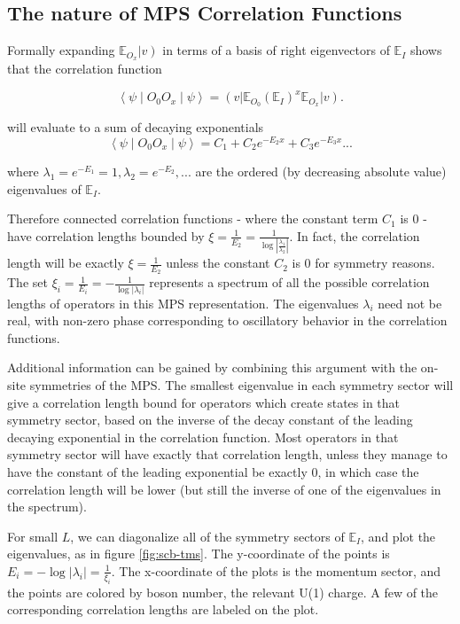 \documentclass{article}
\newcommand{\braopket}[3]{\left \langle #1 \middle |#2 \middle | #3 \right \rangle}
\newcommand{\vbra}[1]{\left ( #1 \right |}
\newcommand{\vket}[1]{\left |#1 \right )}
\begin{document}
\subsection{The nature of MPS Correlation Functions}

Formally expanding $\mathbb{E}_{O_x}\vket{v}$ in terms of a basis of right eigenvectors of $\mathbb{E}_{I}$ shows that the correlation function

\begin{equation}
\braopket{\psi}{O_0 O_x}{ \psi} = \vbra{v} \mathbb{E}_{O_0} (\mathbb{E}_{I})^x \mathbb{E}_{O_x}\vket{v}.
\label{eq:corr}
\end{equation}

will evaluate to a sum of decaying exponentials 
$$
\braopket{\psi}{O_0 O_x}{ \psi} = C_1 + C_2 e^{-E_2 x} + C_3 e^{-E_3 x} ...
$$

where $\lambda_1 = e^{-E_1} = 1, \lambda_2 = e^{-E_2}, ...$ are the ordered (by decreasing absolute value) eigenvalues of $\mathbb{E}_{I}$.

Therefore connected correlation functions - where the constant term $C_1$ is 0 - have correlation lengths bounded by $\xi = \frac{1}{E_2} = \frac{1}{\log{|\frac{\lambda_1}{\lambda_2}|}}$. In fact, the correlation length will be exactly $\xi = \frac{1}{E_2}$ unless the constant $C_2$ is 0 for symmetry reasons. The set $\xi_i = \frac{1}{E_i} = -\frac{1}{\log{|\lambda_i|}}$ represents a spectrum of all the possible correlation lengths of operators in this MPS representation. The eigenvalues $\lambda_i$ need not be real, with non-zero phase corresponding to oscillatory behavior in the correlation functions. 

Additional information can be gained by combining this argument with the on-site symmetries of the MPS. The smallest eigenvalue in each symmetry sector will give a correlation length bound for operators which create states in that symmetry sector, based on the inverse of the decay constant of the leading decaying exponential in the correlation function. Most operators in that symmetry sector will have exactly that correlation length, unless they manage to have the constant of the leading exponential be exactly 0, in which case the correlation length will be lower (but still the inverse of one of the eigenvalues in the spectrum). 

For small $L$, we can diagonalize all of the symmetry sectors of $\mathbb{E}_{I}$, and plot the eigenvalues, as in figure \ref{fig:scb-tms}. The y-coordinate of the points is $ E_i = - \log{|\lambda_i|} = \frac{1}{\xi_i}$. The x-coordinate of the plots is the momentum sector, and the points are colored by boson number, the relevant U(1) charge. A few of the corresponding correlation lengths are labeled on the plot. 
\end{document}
